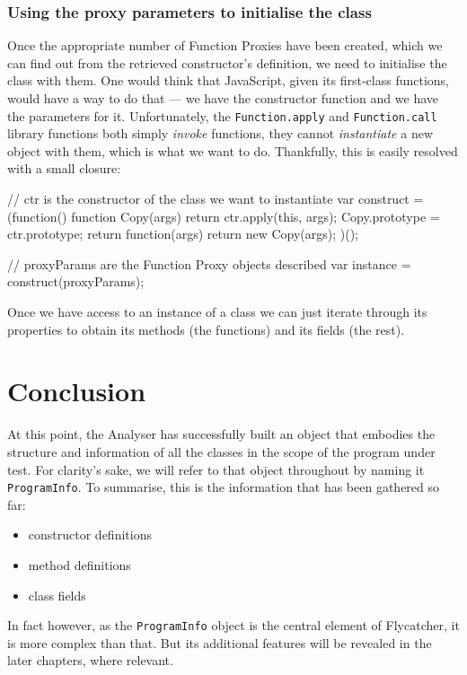 \subsubsection{Using the proxy parameters to initialise the class}
Once the appropriate number of Function Proxies have been created, which we can find out from the retrieved constructor's definition, we need to initialise the class with them. One would think that JavaScript, given its first-class functions, would have a way to do that --- we have the constructor function and we have the parameters for it. Unfortunately, the \texttt{Function.apply} and \texttt{Function.call} library functions both simply \emph{invoke} functions, they cannot \emph{instantiate} a new object with them, which is what we want to do. Thankfully, this is easily resolved with a small closure:

\begin{code}[caption=Instantiating a \texttt{Function} object,label=instantiatingfn]
// ctr is the constructor of the class we want to instantiate
var construct = (function() {
    function Copy(args) {
        return ctr.apply(this, args);
    }
    Copy.prototype = ctr.prototype;
    return function(args) {
        return new Copy(args);
    }
})();

// proxyParams are the Function Proxy objects described
var instance = construct(proxyParams);
\end{code}

Once we have access to an instance of a class we can just iterate through its properties to obtain its methods (the functions) and its fields (the rest).

\section{Conclusion}
At this point, the Analyser has successfully built an object that embodies the structure and information of all the classes in the scope of the program under test. For clarity's sake, we will refer to that object throughout by naming it \texttt{ProgramInfo}. To summarise, this is the information that has been gathered so far:

\begin{itemize}
   \item constructor definitions \checkmark
   \item method definitions \checkmark
   \item class fields \checkmark
\end{itemize}

In fact however, as the \texttt{ProgramInfo} object is the central element of \textsf{Flycatcher}, it is more complex than that. But its additional features will be revealed in the later chapters, where relevant.
